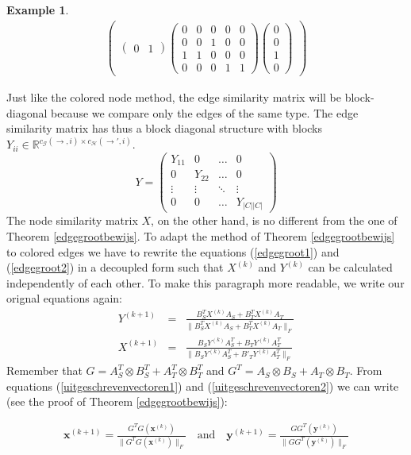 \documentclass[a4paper,11pt]{report}
\newtheorem{example}[theorem]{Example}
\newcommand{\R}{{\mathbb R}}
\newcommand{\graf}{\mathscr{G}}
\newcommand{\grafeen}{\mathscr{H}}
\begin{document}
\begin{example}
\begin{eqnarray*}
\begin{pmatrix}
\begin{pmatrix}
0&1
\end{pmatrix}
\begin{pmatrix}
0&0&0&0&0\\
0&0&1&0&0\\
1&1&0&0&0\\
0&0&0&1&1
\end{pmatrix}
\begin{pmatrix}
0\\
0\\
1\\
0
\end{pmatrix}
\end{pmatrix}
\end{eqnarray*}
\end{example}

Just like the colored node method, the edge similarity matrix will be 
block-diagonal because we compare only the edges of the same type. The edge 
similarity matrix has thus a block diagonal structure with blocks $Y_{ii} \in \R^{c_\graf(\to, i) \times c_\grafeen(\to', i)}.$
$$Y = \begin{pmatrix}
Y_{11} & 0 & \ldots & 0\\
0 & Y_{22} & \ldots & 0\\
\vdots & \vdots & \ddots & \vdots \\
0 & 0 & \ldots & Y_{|C||C|}
\end{pmatrix}$$
The node similarity matrix $X$, on the other hand, is no different from the one 
of Theorem \ref{edgegrootbewijs}. To adapt the method of Theorem 
\ref{edgegrootbewijs} to colored edges we have to rewrite the equations (\ref{edgegroot1}) 
and (\ref{edgegroot2}) in a decoupled form such that $X^{(k)}$ and $Y^{(k)}$ can 
be calculated independently of each other. To make this paragraph more readable, we write our orignal equations again:
 \begin{eqnarray*}
  Y^{(k+1)} &=& \frac{B_S^TX^{(k)}A_S + B_T^TX^{(k)}A_T}{\|B_S^TX^{(k)}A_S + 
  B_T^TX^{(k)}A_T\|_F}\\
   X^{(k+1)} &=& \frac{B_SY^{(k)}A_S^T + B_TY^{(k)}A^T_T}{\|B_SY^{(k)}A_S^T + 
   B'_TY^{(k)}A^T_T\|_F}
 \end{eqnarray*}
Remember that $G = A^T_S \otimes B^T_S + A^T_T \otimes B^T_T$ 
and $G^T = A_S \otimes B_S + A_T \otimes B_T$. From equations (\ref{uitgeschrevenvectoren1}) 
and (\ref{uitgeschrevenvectoren2}) we can write (see the proof of Theorem \ref{edgegrootbewijs}):

\begin{eqnarray}
  \mathbf{x}^{(k+1)} = \frac{G^TG(\mathbf{x}^{(k)})}{\|G^TG(\mathbf{x}^{(k)})\|_F} 
\quad \text{and} \quad \mathbf{y}^{(k+1)} = 
\frac{GG^T(\mathbf{y}^{(k)})}{\|GG^T(\mathbf{y}^{(k)})\|_F}\end{eqnarray}\label{decoupled}
\end{document}
